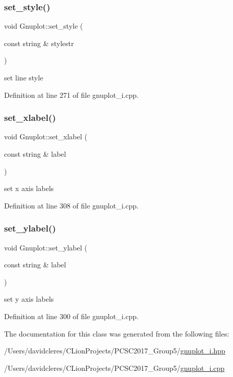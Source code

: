 \subsubsection{\texorpdfstring{set\+\_\+style()}{set\_style()}}
{\footnotesize\ttfamily void Gnuplot\+::set\+\_\+style (\begin{DoxyParamCaption}\item[{const string \&}]{stylestr }\end{DoxyParamCaption})}



set line style 



Definition at line 271 of file gnuplot\+\_\+i.\+cpp.

\mbox{\label{class_gnuplot_ac9b0c04d47e375eb82f50437eda5e46e}} 
\subsubsection{\texorpdfstring{set\+\_\+xlabel()}{set\_xlabel()}}
{\footnotesize\ttfamily void Gnuplot\+::set\+\_\+xlabel (\begin{DoxyParamCaption}\item[{const string \&}]{label }\end{DoxyParamCaption})}



set x axis labels 



Definition at line 308 of file gnuplot\+\_\+i.\+cpp.

\mbox{\label{class_gnuplot_af85dd1d368699914112460285ead0fde}} 
\subsubsection{\texorpdfstring{set\+\_\+ylabel()}{set\_ylabel()}}
{\footnotesize\ttfamily void Gnuplot\+::set\+\_\+ylabel (\begin{DoxyParamCaption}\item[{const string \&}]{label }\end{DoxyParamCaption})}



set y axis labels 



Definition at line 300 of file gnuplot\+\_\+i.\+cpp.



The documentation for this class was generated from the following files\+:\begin{DoxyCompactItemize}
\item 
/\+Users/davidcleres/\+C\+Lion\+Projects/\+P\+C\+S\+C2017\+\_\+\+Group5/\mbox{\hyperlink{gnuplot__i_8hpp}{gnuplot\+\_\+i.\+hpp}}\item 
/\+Users/davidcleres/\+C\+Lion\+Projects/\+P\+C\+S\+C2017\+\_\+\+Group5/\mbox{\hyperlink{gnuplot__i_8cpp}{gnuplot\+\_\+i.\+cpp}}\end{DoxyCompactItemize}
